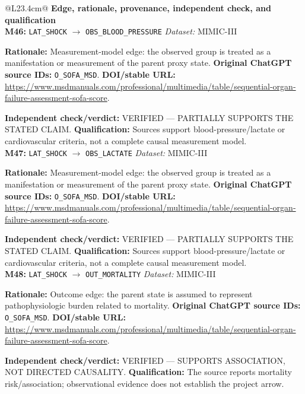 \begin{tabular}{@{}L{23.4cm}@{}}
\toprule
\textbf{Edge, rationale, provenance, independent check, and qualification}\\
\midrule
\textbf{M46:} \nolinkurl{LAT_SHOCK} $\rightarrow$ \nolinkurl{OBS_BLOOD_PRESSURE} \hfill \textit{Dataset:} MIMIC-III\par\textbf{Rationale:} Measurement-model edge: the observed group is treated as a manifestation or measurement of the parent proxy state. \textbf{Original ChatGPT source IDs:} \nolinkurl{O_SOFA_MSD}. \textbf{DOI/stable URL:} \url{https://www.msdmanuals.com/professional/multimedia/table/sequential-organ-failure-assessment-sofa-score}.\par\textbf{Independent check/verdict:} VERIFIED --- PARTIALLY SUPPORTS THE STATED CLAIM. \textbf{Qualification:} Sources support blood-pressure/lactate or cardiovascular criteria, not a complete causal measurement model. \\
\addlinespace[2pt]
\midrule
\textbf{M47:} \nolinkurl{LAT_SHOCK} $\rightarrow$ \nolinkurl{OBS_LACTATE} \hfill \textit{Dataset:} MIMIC-III\par\textbf{Rationale:} Measurement-model edge: the observed group is treated as a manifestation or measurement of the parent proxy state. \textbf{Original ChatGPT source IDs:} \nolinkurl{O_SOFA_MSD}. \textbf{DOI/stable URL:} \url{https://www.msdmanuals.com/professional/multimedia/table/sequential-organ-failure-assessment-sofa-score}.\par\textbf{Independent check/verdict:} VERIFIED --- PARTIALLY SUPPORTS THE STATED CLAIM. \textbf{Qualification:} Sources support blood-pressure/lactate or cardiovascular criteria, not a complete causal measurement model. \\
\addlinespace[2pt]
\midrule
\textbf{M48:} \nolinkurl{LAT_SHOCK} $\rightarrow$ \nolinkurl{OUT_MORTALITY} \hfill \textit{Dataset:} MIMIC-III\par\textbf{Rationale:} Outcome edge: the parent state is assumed to represent pathophysiologic burden related to mortality. \textbf{Original ChatGPT source IDs:} \nolinkurl{O_SOFA_MSD}. \textbf{DOI/stable URL:} \url{https://www.msdmanuals.com/professional/multimedia/table/sequential-organ-failure-assessment-sofa-score}.\par\textbf{Independent check/verdict:} VERIFIED --- SUPPORTS ASSOCIATION, NOT DIRECTED CAUSALITY. \textbf{Qualification:} The source reports mortality risk/association; observational evidence does not establish the project arrow. \\

\end{tabular}
